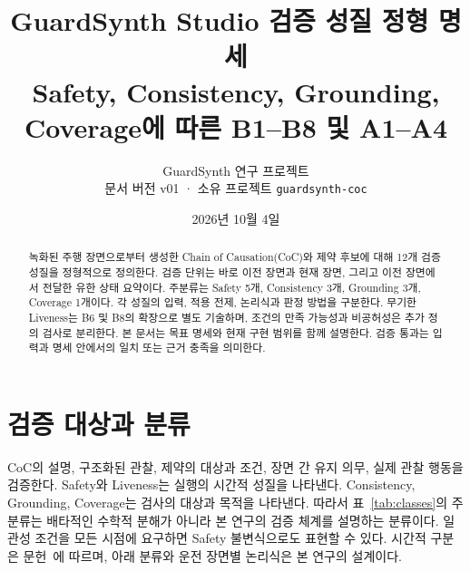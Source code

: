 \documentclass[11pt,a4paper]{article}
\title{GuardSynth Studio 검증 성질 정형 명세\\[0.4em]
\large Safety, Consistency, Grounding, Coverage에 따른 B1--B8 및 A1--A4}
\author{GuardSynth 연구 프로젝트\\\small 문서 버전 v01 · 소유 프로젝트 \texttt{guardsynth-coc}}
\date{2026년 10월 4일}
\begin{document}
\maketitle

\begin{abstract}
녹화된 주행 장면으로부터 생성한 Chain of Causation(CoC)와 제약 후보에 대해
12개 검증 성질을 정형적으로 정의한다. 검증 단위는 바로 이전 장면과 현재 장면,
그리고 이전 장면에서 전달한 유한 상태 요약이다. 주분류는
Safety 5개, Consistency 3개, Grounding 3개, Coverage 1개이다.
각 성질의 입력, 적용 전제, 논리식과 판정 방법을 구분한다.
무기한 Liveness는 B6 및 B8의 확장으로 별도 기술하며,
조건의 만족 가능성과 비공허성은 추가 정의 검사로 분리한다.
본 문서는 목표 명세와 현재 구현 범위를 함께 설명한다.
검증 통과는 입력과 명세 안에서의 일치 또는 근거 충족을 의미한다.
\end{abstract}

\section{검증 대상과 분류}
CoC의 설명, 구조화된 관찰, 제약의 대상과 조건,
장면 간 유지 의무, 실제 관찰 행동을 검증한다.
Safety와 Liveness는 실행의 시간적 성질을 나타낸다.
Consistency, Grounding, Coverage는 검사의 대상과 목적을 나타낸다.
따라서 표~\ref{tab:classes}의 주분류는 배타적인 수학적 분해가 아니라
본 연구의 검증 체계를 설명하는 분류이다.
일관성 조건을 모든 시점에 요구하면 Safety 불변식으로도 표현할 수 있다.
시간적 구분은 문헌~\cite{lamport}에 따르며, 아래 분류와 운전 장면별 논리식은 본 연구의 설계이다.
\end{document}
